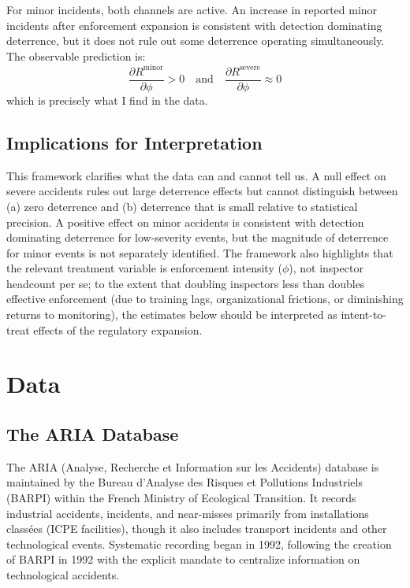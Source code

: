 \documentclass[12pt]{article}
\begin{document}
For minor incidents, both channels are active. An increase in reported minor incidents after enforcement expansion is consistent with detection dominating deterrence, but it does not rule out some deterrence operating simultaneously. The observable prediction is:
\begin{equation}
\frac{\partial R^{\text{minor}}}{\partial \phi} > 0 \quad \text{and} \quad \frac{\partial R^{\text{severe}}}{\partial \phi} \approx 0
\end{equation}
which is precisely what I find in the data.

\subsection{Implications for Interpretation}

This framework clarifies what the data can and cannot tell us. A null effect on severe accidents rules out large deterrence effects but cannot distinguish between (a) zero deterrence and (b) deterrence that is small relative to statistical precision. A positive effect on minor accidents is consistent with detection dominating deterrence for low-severity events, but the magnitude of deterrence for minor events is not separately identified. The framework also highlights that the relevant treatment variable is enforcement intensity ($\phi$), not inspector headcount per se; to the extent that doubling inspectors less than doubles effective enforcement (due to training lags, organizational frictions, or diminishing returns to monitoring), the estimates below should be interpreted as intent-to-treat effects of the regulatory expansion.


\section{Data}
\label{sec:data}

\subsection{The ARIA Database}

The ARIA (Analyse, Recherche et Information sur les Accidents) database is maintained by the Bureau d'Analyse des Risques et Pollutions Industriels (BARPI) within the French Ministry of Ecological Transition. It records industrial accidents, incidents, and near-misses primarily from installations class\'ees (ICPE facilities), though it also includes transport incidents and other technological events. Systematic recording began in 1992, following the creation of BARPI in 1992 with the explicit mandate to centralize information on technological accidents.
\end{document}
